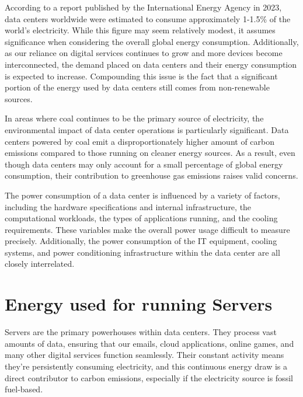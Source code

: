 \documentclass[
  a4paper,  %
  twoside,  %
  bibliography=totoc,
  headsepline,
  cleardoublepage=empty,
  parskip=half,
  draft=false
]{scrbook}
\begin{document}
According to a report published by the International Energy Agency\cite{ieaDataCentres} in 2023, data centers worldwide were estimated to consume approximately 1-1.5\% of the world's electricity. While this figure may seem relatively modest, it assumes significance when considering the overall global energy consumption. Additionally, as our reliance on digital services continues to grow and more devices become interconnected, the demand placed on data centers and their energy consumption is expected to increase\cite{schomaker2015energy}. Compounding this issue is the fact that a significant portion of the energy used by data centers still comes from non-renewable sources\cite{ritchie2024energy}.

In areas where coal continues to be the primary source of electricity, the environmental impact of data center operations is particularly significant\cite{finkelman2021future}. Data centers powered by coal emit a disproportionately higher amount of carbon emissions compared to those running on cleaner energy sources. As a result, even though data centers may only account for a small percentage of global energy consumption, their contribution to greenhouse gas emissions raises valid concerns.



The power consumption of a data center is influenced by a variety of factors, including the hardware specifications and internal infrastructure, the computational workloads, the types of applications running, and the cooling requirements\cite{dayarathna2015data}. These variables make the overall power usage difficult to measure precisely. Additionally, the power consumption of the IT equipment, cooling systems, and power conditioning infrastructure within the data center are all closely interrelated.


\section{Energy used for running Servers}

Servers are the primary powerhouses within data centers. They process vast amounts of data, ensuring  that  our  emails,  cloud  applications, online games, and many other digital services function seamlessly\cite{techtargetMajorServer}. Their constant  activity means they're persistently consuming electricity\cite{energyinnovationMuchEnergy}, and this continuous energy draw is a direct contributor to carbon emissions, especially if the electricity source is fossil fuel-based.
\end{document}
